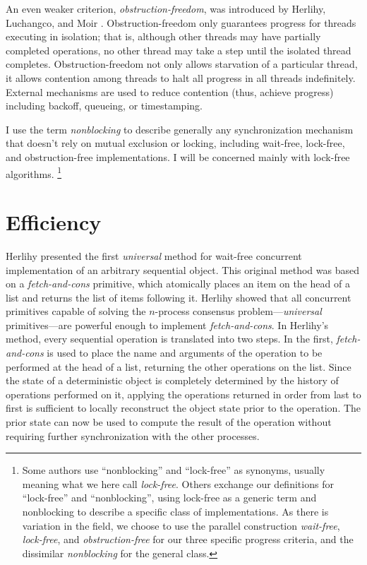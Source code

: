 An even weaker criterion, \emph{obstruction-freedom}, was introduced
by Herlihy, Luchangco, and Moir \cite{HerlihyLuMo03}.
Obstruction-freedom only guarantees progress for threads executing in
isolation; that is, although other threads may have partially
completed operations, no other thread may take a step until the
isolated thread completes.  Obstruction-freedom not only allows
starvation of a particular thread, it allows contention among threads
to halt all progress in all threads
indefinitely.  External mechanisms are used to reduce contention
(thus, achieve progress) including backoff, queueing, or timestamping.

I use the term \emph{nonblocking} to describe
generally any synchronization mechanism that doesn't rely on mutual
exclusion or locking, including wait-free, lock-free,
and obstruction-free implementations.
I will be concerned mainly with lock-free algorithms.%
\footnote{Some authors use ``nonblocking'' and
  ``lock-free'' as synonyms, usually meaning what we here call
  \emph{lock-free}.  Others exchange our definitions for ``lock-free''
  and ``nonblocking'', using lock-free as a generic term and nonblocking
  to describe a specific class of implementations.  As there is
  variation in the field, we choose to use the parallel construction
  \emph{wait-free}, \emph{lock-free}, and \emph{obstruction-free} for
  our three specific progress criteria, and the dissimilar
  \emph{nonblocking} for the general class.}

\section{Efficiency}\label{sec:efficiency}
Herlihy \cite{Herlihy88,Herlihy91}
presented the first \emph{universal} method for wait-free
concurrent implementation of an arbitrary sequential object.
This original method was based on
a \emph{fetch-and-cons} primitive, which atomically places
an item on the head of a list and returns the list of items following
it.  Herlihy showed that all concurrent primitives capable of solving the
$n$-process consensus problem---\emph{universal} primitives---are
powerful enough to implement \emph{fetch-and-cons}.
In Herlihy's method, 
every sequential operation is translated into two steps.  In the first,
\emph{fetch-and-cons} is used to place the name and arguments of the
operation to be performed
at the head of a list, returning the other operations on the list.
Since the state
of a deterministic object is completely determined by the history of
operations performed on it, applying the operations returned
in order from last to first is sufficient to locally reconstruct the
object state 
prior to the operation.
The prior state can now be used to compute the result of the operation
without requiring further synchronization with the other processes.


